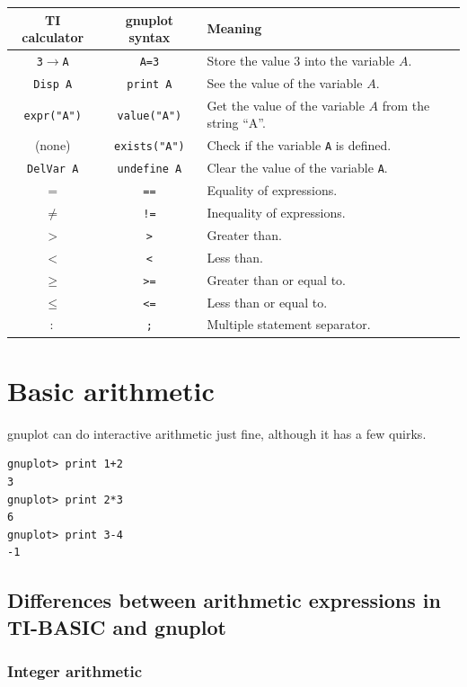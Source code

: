 \documentclass[11pt,letterpaper]{report}
\begin{document}
\noindent
\begin{tabular}{|c|c|l|}
\hline 
TI calculator & gnuplot syntax & Meaning \\ 
\hline 
\verb+3+$\rightarrow$\verb+A+ & \lstinline+A=3+ & Store the value $3$ into the variable $A$. \\ 
\hline
\verb+Disp A+ & \lstinline+print A+ & See the value of the variable $A$. \\ 
\hline 
\verb+expr("A")+ & \lstinline+value("A")+ & Get the value of the variable $A$ from the string ``A''. \\ 
\hline
(none) & \verb+exists("A")+ & Check if the variable \verb+A+ is defined. \\ 
\hline
\verb+DelVar A+ & \lstinline+undefine A+ & Clear the value of the variable \verb+A+. \\ 
\hline
$=$ & \lstinline+==+ & Equality of expressions. \\ 
\hline
$\neq$ & \lstinline+!=+ & Inequality of expressions.\\ 
\hline 
$>$ & \lstinline+>+ & Greater than.\\ 
\hline
$<$ & \lstinline+<+ & Less than.\\ 
\hline
$\geq$ & \lstinline+>=+ & Greater than or equal to.\\ 
\hline
$\leq$ & \lstinline+<=+ & Less than or equal to.\\ 
\hline
$:$ & \lstinline+;+ & Multiple statement separator.\\ 
\hline
\end{tabular} 

\chapter{Basic arithmetic}

gnuplot can do interactive arithmetic just fine, although it has a few quirks.
\begin{lstlisting}
gnuplot> print 1+2
3
gnuplot> print 2*3
6
gnuplot> print 3-4
-1
\end{lstlisting}

\section{Differences between arithmetic expressions in TI-BASIC and gnuplot}

\subsection{Integer arithmetic}
\end{document}
